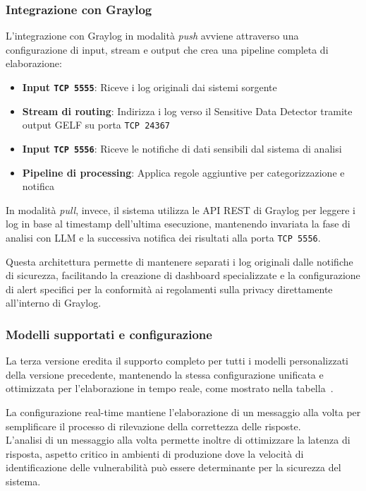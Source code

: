 \documentclass[12pt,twoside]{report}
\begin{document}
\subsubsection{Integrazione con Graylog}
\label{subsubsec:ver3_integrazione}

L'integrazione con Graylog in modalità \textit{push} avviene attraverso una configurazione di input, stream e output che crea una pipeline completa di elaborazione:

\begin{itemize}
    \item \textbf{Input \texttt{TCP 5555}}: Riceve i log originali dai sistemi sorgente
    \item \textbf{Stream di routing}: Indirizza i log verso il Sensitive Data Detector tramite output GELF su porta \texttt{TCP 24367}
    \item \textbf{Input \texttt{TCP 5556}}: Riceve le notifiche di dati sensibili dal sistema di analisi
    \item \textbf{Pipeline di processing}: Applica regole aggiuntive per categorizzazione e notifica
\end{itemize}

In modalità \textit{pull}, invece, il sistema utilizza le API REST di Graylog per leggere i log in base al timestamp dell'ultima esecuzione, mantenendo invariata la fase di analisi con LLM e la successiva notifica dei risultati alla porta \texttt{TCP 5556}.

Questa architettura permette di mantenere separati i log originali dalle notifiche di sicurezza, facilitando la creazione di dashboard specializzate e la configurazione di alert specifici per la conformità ai regolamenti sulla privacy direttamente all'interno di Graylog.

\subsubsection{Modelli supportati e configurazione}
\label{subsubsec:ver3_modelli_supportati}

La terza versione eredita il supporto completo per tutti i modelli personalizzati della versione precedente, mantenendo la stessa configurazione unificata e ottimizzata per l'elaborazione in tempo reale, come mostrato nella tabella~.

La configurazione real-time mantiene l'elaborazione di un messaggio alla volta per semplificare il processo di rilevazione della correttezza delle risposte.\\
L'analisi di un messaggio alla volta permette inoltre di ottimizzare la latenza di risposta, aspetto critico in ambienti di produzione dove la velocità di identificazione delle vulnerabilità può essere determinante per la sicurezza del sistema.
\end{document}

